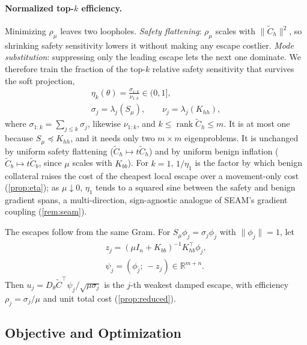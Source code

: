 \documentclass[11pt]{article}
\newcommand{\R}{\mathbb{R}}
\newcommand{\rhoreg}{\rho_{\mu}}
\newcommand{\etak}{\eta_{k}}
\newcommand{\Cth}{\widetilde{C}_{h}}
\newcommand{\Ctb}{\widetilde{C}_{b}}
\newcommand{\Smu}{S_{\mu}}
\begin{document}
\paragraph{Normalized top-$k$ efficiency.}
Minimizing $\rhoreg$ leaves two loopholes. \emph{Safety flattening}: $\rhoreg$ scales with $\|\Cth\|^2$, so shrinking safety sensitivity lowers it without making any escape costlier. \emph{Mode substitution}: suppressing only the leading escape lets the next one dominate. We therefore train the fraction of the top-$k$ relative safety sensitivity that survives the soft projection,
\begin{equation}
\begin{gathered}
\etak(\theta)=\frac{\sigma_{1:k}}{\nu_{1:k}}\in(0,1],\\
\sigma_j=\lambda_j(\Smu),\qquad \nu_j=\lambda_j(K_{hh}),
\end{gathered}
\label{eq:eta}
\end{equation}
where $\sigma_{1:k}=\sum_{j\le k}\sigma_j$, likewise $\nu_{1:k}$, and $k\le\operatorname{rank}\Cth\le m$. It is at most one because $\Smu\preceq K_{hh}$, and it needs only two $m\times m$ eigenproblems. It is unchanged by uniform safety flattening ($\Cth\mapsto t\Cth$) and by uniform benign inflation ($\Ctb\mapsto t\Ctb$, since $\mu$ scales with $K_{bb}$). For $k=1$, $1/\eta_1$ is the factor by which benign collateral raises the cost of the cheapest local escape over a movement-only cost (\cref{prop:eta}); as $\mu\downarrow0$, $\eta_1$ tends to a squared sine between the safety and benign gradient spans, a multi-direction, sign-agnostic analogue of SEAM's gradient coupling (\cref{rem:seam}).

The escapes follow from the same Gram. For $\Smu\phi_j=\sigma_j\phi_j$ with $\|\phi_j\|=1$, let
\begin{equation}
\begin{gathered}
z_j=(\mu I_n+K_{bb})^{-1}K_{hb}^\top\phi_j,\\
\psi_j=(\phi_j;\,-z_j)\in\R^{m+n}.
\end{gathered}
\label{eq:escape}
\end{equation}
Then $u_j=D_\theta\widetilde C^\top\psi_j/\sqrt{\mu\sigma_j}$ is the $j$-th weakest damped escape, with efficiency $\rho_j=\sigma_j/\mu$ and unit total cost (\cref{prop:reduced}).



\subsection{Objective and Optimization}
\label{sec:objective}
\end{document}
